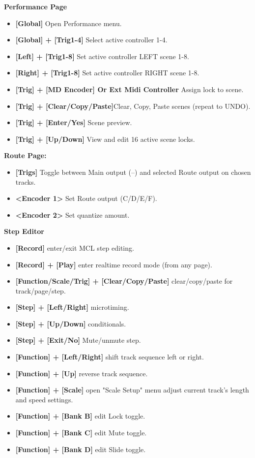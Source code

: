 \newpage
\textbf{Performance Page}
\begin{itemize}
      \item \textbf{[Global]} Open Performance menu.
      \item \textbf{[Global] + [Trig1-4]} Select active controller 1-4.
      \item \textbf{[Left] + [Trig1-8]} Set active controller LEFT scene 1-8.
      \item \textbf{[Right] + [Trig1-8]} Set active controller RIGHT scene 1-8.
      \item \textbf{[Trig] + [MD Encoder] Or Ext Midi Controller} Assign lock to scene.
      \item \textbf{[Trig] + [Clear/Copy/Paste]}Clear, Copy, Paste scenes (repeat to UNDO).
      \item \textbf{[Trig] + [Enter/Yes]} Scene preview.
      \item \textbf{[Trig] + [Up/Down]} View and edit 16 active scene locks.
      \end{itemize}
   \textbf{Route Page:} 
\begin{itemize}

     \item \textbf{[Trigs] }Toggle between Main output (--) and selected Route output on chosen tracks.
     \item \textbf{<Encoder 1>} Set Route output (C/D/E/F).
     \item \textbf{<Encoder 2>} Set quantize amount.
     \end{itemize}
\textbf{Step Editor}
\begin{itemize}
      \item \textbf{[Record]} enter/exit MCL step editing.
      \item \textbf{[Record] + [Play]} enter realtime record mode (from any page).
      \item \textbf{[Function/Scale/Trig] + [Clear/Copy/Paste]} clear/copy/paste for track/page/step.
      \item \textbf{[Step] + [Left/Right]} microtiming.
      \item \textbf{[Step] + [Up/Down]} conditionals.
      \item \textbf{[Step] + [Exit/No]} Mute/unmute step.
      \item \textbf{[Function] + [Left/Right]} shift track sequence left or right.
      \item \textbf{[Function] + [Up]} reverse track sequence.
      \item \textbf{[Function] + [Scale]} open "Scale Setup" menu adjust current track's length and speed settings.
      \item \textbf{[Function] + [Bank B]} edit Lock toggle.
      \item \textbf{[Function] + [Bank C]} edit Mute toggle.
      \item \textbf{[Function] + [Bank D]} edit Slide toggle.
\end{itemize}
